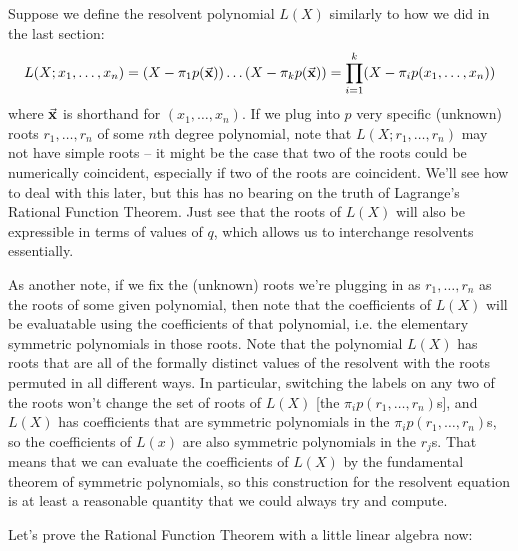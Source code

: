 \documentclass[12pt]{scrartcl}
\begin{document}
\begin{remark}
    Suppose we define the resolvent polynomial $L(X)$ similarly to how we did in the last section: 
    \[
        L(X; x_1, \dots, x_n) = (X - \pi_1 p(\vec{\mathbf{x}})) \dots (X - \pi_k p(\vec{\mathbf{x}})) = \prod_{i=1}^k (X - \pi_i p(x_1, \dots, x_n)) 
    \]  
    where $\vec{\mathbf{x}}$ is shorthand for $(x_1, \dots, x_n)$. 
    If we plug into $p$ very specific (unknown) roots $r_1, \dots, r_n$ of some $n$th degree polynomial, note that $L(X; r_1, \dots, r_n)$ may not have simple roots -- it might be the case that two of the roots could be numerically coincident, especially if two of the roots are coincident. We'll see how to deal with this later, but this has no bearing on the truth of Lagrange's Rational Function Theorem. Just see that the roots of $L(X)$ will also be expressible in terms of values of $q$, which allows us to interchange resolvents essentially. 
    
    As another note, if we fix the (unknown) roots we're plugging in as $r_1, \dots, r_n$ as the roots of some given polynomial, then note that the coefficients of $L(X)$ will be evaluatable using the coefficients of that polynomial, i.e. the elementary symmetric polynomials in those roots. Note that the polynomial $L(X)$ has roots that are all of the formally distinct values of the resolvent with the roots permuted in all different ways. In particular, switching the labels on any two of the roots won't change the set of roots of $L(X)$ [the $\pi_i p(r_1, \dots, r_n)$s], and $L(X)$ has coefficients that are symmetric polynomials in the $\pi_i p(r_1, \dots, r_n)$s, so the coefficients of $L(x)$ are also symmetric polynomials in the $r_j$s. That means that we can evaluate the coefficients of $L(X)$ by the fundamental theorem of symmetric polynomials, so this construction for the resolvent equation is at least a reasonable quantity that we could always try and compute. 
\end{remark}
Let's prove the Rational Function Theorem with a little linear algebra now: 
\end{document}
